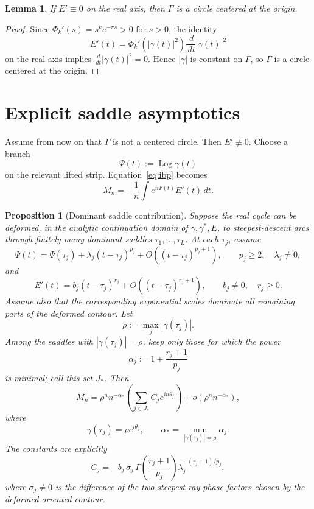 \documentclass[11pt]{article}
\newtheorem{proposition}[theorem]{Proposition}
\newtheorem{lemma}[theorem]{Lemma}
\newcommand{\dd}{\,d}
\newcommand{\Log}{\operatorname{Log}}
\begin{document}
\begin{lemma}\label{lem:constant-radius}
If \(E'\equiv0\) on the real axis, then \(\Gamma\) is a circle centered at the
origin.
\end{lemma}

\begin{proof}
Since \(\Phi_k'(s)=s^k e^{-\pi s}>0\) for \(s>0\), the identity
\[
  E'(t)=\Phi_k'(|\gamma(t)|^2)\frac{\dd}{\dd t}|\gamma(t)|^2
\]
on the real axis implies \(\frac{\dd}{\dd t}|\gamma(t)|^2=0\).  Hence
\(|\gamma|\) is constant on \(\Gamma\), so \(\Gamma\) is a circle centered at
the origin.
\end{proof}

\section{Explicit saddle asymptotics}

Assume from now on that \(\Gamma\) is not a centered circle.  Then
\(E'\not\equiv0\).  Choose a branch
\[
  \Psi(t):=\Log \gamma(t)
\]
on the relevant lifted strip.  Equation~\eqref{eq:ibp} becomes
\begin{equation}\label{eq:saddle-integral}
  M_n=-\frac1n\int e^{n\Psi(t)}E'(t)\dd t .
\end{equation}

\begin{proposition}[Dominant saddle contribution]\label{prop:saddle}
Suppose the real cycle can be deformed, in the analytic continuation domain of
\(\gamma,\gamma^*,E\), to steepest-descent arcs through finitely many dominant
saddles \(\tau_1,\dots,\tau_L\).  At each \(\tau_j\), assume
\[
  \Psi(t)=\Psi(\tau_j)+\lambda_j(t-\tau_j)^{p_j}
  +O((t-\tau_j)^{p_j+1}),
  \qquad p_j\ge2,\quad \lambda_j\ne0,
\]
and
\[
  E'(t)=b_j(t-\tau_j)^{r_j}+O((t-\tau_j)^{r_j+1}),
  \qquad b_j\ne0,\quad r_j\ge0.
\]
Assume also that the corresponding exponential scales dominate all remaining
parts of the deformed contour.  Let
\[
  \rho:=\max_j |\gamma(\tau_j)|.
\]
Among the saddles with \(|\gamma(\tau_j)|=\rho\), keep only those for which the
power
\[
  \alpha_j:=1+\frac{r_j+1}{p_j}
\]
is minimal; call this set \(J_*\).  Then
\begin{equation}\label{eq:saddle-asymptotic}
  M_n
  =
  \rho^n n^{-\alpha_*}
  \left(
    \sum_{j\in J_*} C_j e^{in\theta_j}
  \right)
  +o(\rho^n n^{-\alpha_*}),
\end{equation}
where
\[
  \gamma(\tau_j)=\rho e^{i\theta_j},
  \qquad
  \alpha_*=\min_{|\gamma(\tau_j)|=\rho}\alpha_j .
\]
The constants are explicitly
\begin{equation}\label{eq:Cj}
  C_j
  =
  -b_j\,\sigma_j\,
  \Gamma\!\left(\frac{r_j+1}{p_j}\right)
  \lambda_j^{-(r_j+1)/p_j},
\end{equation}
where \(\sigma_j\ne0\) is the difference of the two steepest-ray phase factors
chosen by the deformed oriented contour.
\end{proposition}
\end{document}
